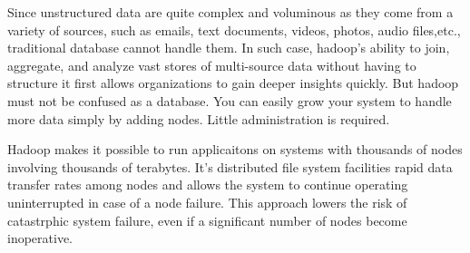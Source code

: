 \documentclass[conference]{IEEEtran}
\begin{document}
\par Since unstructured data are quite complex and voluminous as they come from a variety
of sources, such as emails, text documents, videos, photos, audio files,etc., traditional
database cannot handle them. In such case, hadoop’s ability to join, aggregate, and analyze
vast stores of multi-source data without having to structure it first allows organizations to
gain deeper insights quickly. But hadoop must not be confused as a database. You can easily grow your system to handle more data simply by adding nodes. Little administration is required.
\par Hadoop makes it possible to run applicaitons on systems with thousands of nodes involving thousands of terabytes. It's distributed file system facilities rapid
data transfer rates among nodes and allows the system to continue operating uninterrupted in case of a node failure. This approach lowers the risk of catastrphic system failure,
even if a significant number of nodes become inoperative.
\end{document}
